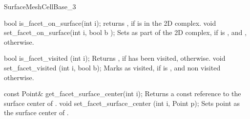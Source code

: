 \begin{ccRefConcept}{SurfaceMeshCellBase_3}
\ccCreation
{}  %



\ccOperations

\ccMethod
{bool is_facet_on_surface(int i);}
{returns , if  is in the 2D complex. }
\ccGlue
\ccMethod
{void set_facet_on_surface(int i, bool b );}
{Sets  as part of the 2D  complex, if  is ,
and , otherwise.}


\ccMethod
{bool is_facet_visited (int i);}
{Returns , if  has been visited,
 otherwise.}
\ccGlue
\ccMethod
{void set_facet_visited (int i, bool b);} 
{Marks  as visited, if  is ,
 and non visited otherwise.}


\ccMethod
{const Point&   get_facet_surface_center(int i);}
{Returns a const reference to the surface center of .}
\ccGlue
\ccMethod
{void set_facet_surface_center (int i, Point p);} 
{Sets point  as the surface center of .}


    




\ccHasModels

 \\

\ccSeeAlso

 \\
 \\
\\
 \\





\end{ccRefConcept}


